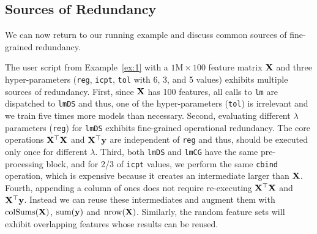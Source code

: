 \subsection{Sources of Redundancy} 
\label{sec:redundancy}

We can now return to our running example and discuss common sources of fine-grained redundancy.

\begin{example}  
The user script from Example~\ref{ex:1} with a $1\text{M} \times 100$ feature matrix $\mathbf{X}$ and three hyper-parameters (\texttt{reg}, \texttt{icpt}, \texttt{tol} with 6, 3, and 5 values) exhibits multiple sources of redundancy. 
%
First, since $\mathbf{X}$ has 100 features, all calls to \texttt{lm} are dispatched to \texttt{lmDS} and thus, one of the hyper-parameters (\texttt{tol}) is irrelevant and we train five times more models than necessary. 
%
Second, evaluating different $\lambda$ parameters (\texttt{reg}) for \texttt{lmDS} exhibits fine-grained operational redundancy. The core operations $\mathbf{X}^{\top}\mathbf{X}$ and $\mathbf{X}^{\top}\mathbf{y}$ are independent of \texttt{reg} and thus, should be executed only once for different $\lambda$. 
%
Third, both \texttt{lmDS} and \texttt{lmCG} have the same pre-processing block, and for 2/3 of \texttt{icpt} values, we perform the same \texttt{cbind} operation, which is expensive because it creates an intermediate larger than $\mathbf{X}$.
%
Fourth, appending a column of ones does not require re-executing $\mathbf{X}^{\top}\mathbf{X}$ and $\mathbf{X}^{\top}\mathbf{y}$. Instead we can reuse these intermediates and augment them with $\text{colSums}(\mathbf{X})$, $\text{sum}(\mathbf{y})$ and $\text{nrow}(\mathbf{X})$. Similarly, the random feature sets will exhibit overlapping features whose results can be reused.
%
\end{example} 

